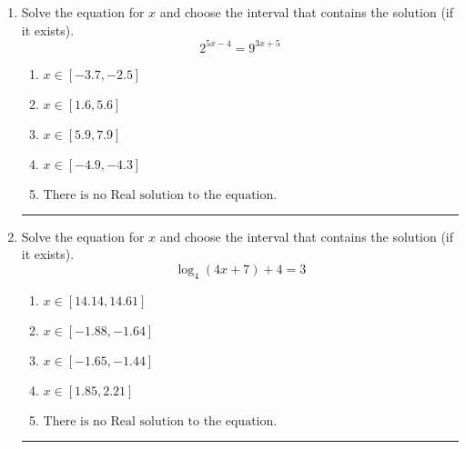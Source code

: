 \documentclass[14pt]{extbook}
\newcommand{\litem}[1]{\item#1\hspace*{-1cm}\rule{\textwidth}{0.4pt}}
\begin{document}
\begin{enumerate}
{\begin{enumerate}[label=\Alph*.]
\end{enumerate} }
\litem{
Solve the equation for $x$ and choose the interval that contains the solution (if it exists).\[ 2^{5x-4} = 9^{3x+5} \]\begin{enumerate}[label=\Alph*.]
\item \( x \in [-3.7, -2.5] \)
\item \( x \in [1.6, 5.6] \)
\item \( x \in [5.9, 7.9] \)
\item \( x \in [-4.9, -4.3] \)
\item \( \text{There is no Real solution to the equation.} \)

\end{enumerate} }
\litem{
Solve the equation for $x$ and choose the interval that contains the solution (if it exists).\[ \log_{4}{(4x+7)}+4 = 3 \]\begin{enumerate}[label=\Alph*.]
\item \( x \in [14.14, 14.61] \)
\item \( x \in [-1.88, -1.64] \)
\item \( x \in [-1.65, -1.44] \)
\item \( x \in [1.85, 2.21] \)
\item \( \text{There is no Real solution to the equation.} \)

\end{enumerate} }
\end{enumerate}
\end{document}
